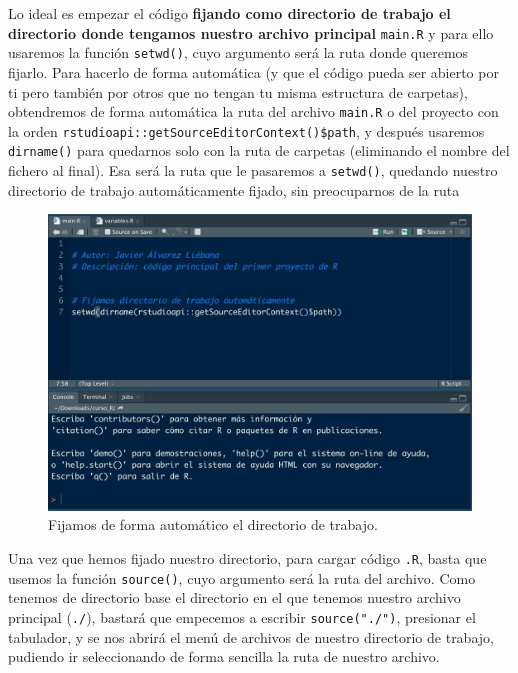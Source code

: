 \documentclass[11pt,]{book}
\newenvironment{Shaded}{\begin{snugshade}}{\end{snugshade}}
\newcommand{\CommentTok}[1]{\textcolor[rgb]{0.37,0.37,0.37}{\textit{#1}}}
\newcommand{\KeywordTok}[1]{\textcolor[rgb]{0.27,0.27,0.27}{\textbf{#1}}}
\newcommand{\NormalTok}[1]{#1}
\newcommand{\OperatorTok}[1]{\textcolor[rgb]{0.43,0.43,0.43}{\textbf{#1}}}
\begin{document}
Lo ideal es empezar el código \textbf{fijando como directorio de trabajo el directorio donde tengamos nuestro archivo principal} \texttt{main.R} y para ello usaremos la función \texttt{setwd()}, cuyo argumento será la ruta donde queremos fijarlo. Para hacerlo de forma automática (y que el código pueda ser abierto por ti pero también por otros que no tengan tu misma estructura de carpetas), obtendremos de forma automática la ruta del archivo \texttt{main.R} o del proyecto con la orden \texttt{rstudioapi::getSourceEditorContext()\$path}, y después usaremos \texttt{dirname()} para quedarnos solo con la ruta de carpetas (eliminando el nombre del fichero al final). Esa será la ruta que le pasaremos a \texttt{setwd()}, quedando nuestro directorio de trabajo automáticamente fijado, sin preocuparnos de la ruta

\begin{Shaded}
\end{Shaded}

\begin{figure}

{\centering \includegraphics[width=0.5\linewidth]{./img/setwd} 

}

\caption{Fijamos de forma automático el directorio de trabajo.}\label{fig:setwd}
\end{figure}

Una vez que hemos fijado nuestro directorio, para cargar código \texttt{.R}, basta que usemos la función \texttt{source()}, cuyo argumento será la ruta del archivo. Como tenemos de directorio base el directorio en el que tenemos nuestro archivo principal (\texttt{./}), bastará que empecemos a escribir \texttt{source("./")}, presionar el tabulador, y se nos abrirá el menú de archivos de nuestro directorio de trabajo, pudiendo ir seleccionando de forma sencilla la ruta de nuestro archivo.
\end{document}
